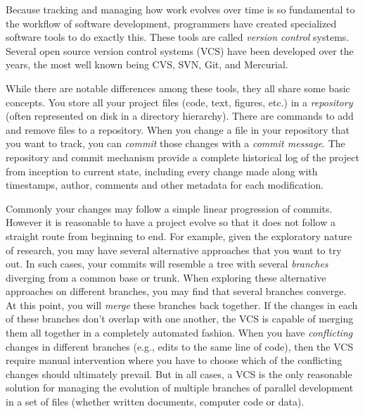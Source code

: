 \documentclass[ChapterTOCs,krantz2]{krantz} %
\theoremstyle{definition}
\begin{document}
Because tracking and managing how work evolves over time is so fundamental to
the workflow of software development, programmers have created specialized
software tools to do exactly this. These tools are called \emph{version
  control} systems. Several open source version control systems (VCS) have been
developed over the years, the most well known being CVS, SVN, Git, and
Mercurial.

While there are notable differences among these tools, they all share some
basic concepts.  You store all your project files (code,
text, figures, etc.) in a \emph{repository} (often represented on disk in a
directory hierarchy).  There are commands to add and remove files to a
repository.  When you change a file in your repository that you want to track,
you can \emph{commit} those changes with a \emph{commit message}.  The
repository and commit mechanism provide a complete historical log of the
project from inception to current state, including every change made along with
timestamps, author, comments and other metadata for each modification.

Commonly your changes may follow a simple linear progression of commits.
However it is reasonable to have a project evolve so that it does not follow a
straight route from beginning to end. For example, given the exploratory nature
of research, you may have several alternative approaches that you want to try
out. In such cases, your commits will resemble a tree with several
\emph{branches} diverging from a common base or trunk. When exploring these
alternative approaches on different branches, you may find that several
branches converge. At this point, you will \emph{merge} these
branches back together.  If the changes in each of these branches don't overlap
with one another, the VCS is capable of merging them all together in a
completely automated fashion.  When you have \emph{conflicting} changes in
different branches (e.g., edits to the same line of code), then the VCS
require manual intervention where you have to choose which of the conflicting
changes should ultimately prevail.  But in all cases, a VCS is the only
reasonable solution for managing the evolution of multiple branches of parallel
development in a set of files (whether written documents, computer code or
data).
\end{document}

